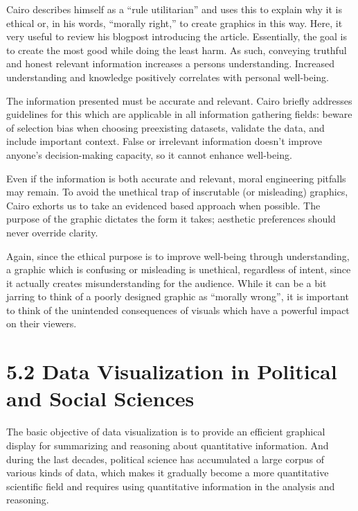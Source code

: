\documentclass[]{book}
\theoremstyle{definition}
\theoremstyle{definition}
\theoremstyle{definition}
\theoremstyle{remark}
\begin{document}
Cairo describes himself as a ``rule utilitarian'' and uses this to
explain why it is ethical or, in his words, ``morally right,'' to create
graphics in this way. Here, it very useful to review his blogpost
introducing the article. Essentially, the goal is to create the most
good while doing the least harm. As such, conveying truthful and honest
relevant information increases a persons understanding. Increased
understanding and knowledge positively correlates with personal
well-being.

The information presented must be accurate and relevant. Cairo briefly
addresses guidelines for this which are applicable in all information
gathering fields: beware of selection bias when choosing preexisting
datasets, validate the data, and include important context. False or
irrelevant information doesn't improve anyone's decision-making
capacity, so it cannot enhance well-being.

Even if the information is both accurate and relevant, moral engineering
pitfalls may remain. To avoid the unethical trap of inscrutable (or
misleading) graphics, Cairo exhorts us to take an evidenced based
approach when possible. The purpose of the graphic dictates the form it
takes; aesthetic preferences should never override clarity.

Again, since the ethical purpose is to improve well-being through
understanding, a graphic which is confusing or misleading is unethical,
regardless of intent, since it actually creates misunderstanding for the
audience. While it can be a bit jarring to think of a poorly designed
graphic as ``morally wrong'', it is important to think of the unintended
consequences of visuals which have a powerful impact on their viewers.

\section{\texorpdfstring{5.2 Data Visualization in \textbf{Political and
Social
Sciences}}{5.2 Data Visualization in Political and Social Sciences}}\label{data-visualization-in-political-and-social-sciences}

\citep{poli_social_science}

The basic objective of data visualization is to provide an efficient
graphical display for summarizing and reasoning about quantitative
information. And during the last decades, political science has
accumulated a large corpus of various kinds of data, which makes it
gradually become a more quantitative scientific field and requires using
quantitative information in the analysis and reasoning.
\end{document}
